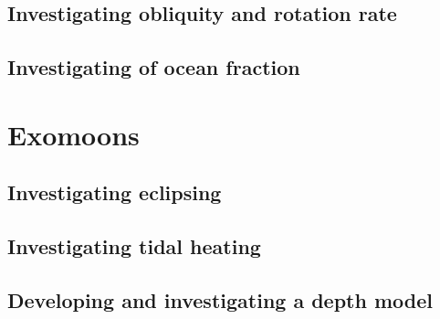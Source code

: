 \documentclass[12pt, onecolumn]{revtex4-2}    %
\begin{document}


\subsection{Investigating obliquity and rotation rate}\label{ssec:InvObliquityRotationRate}
\subsection{Investigating of ocean fraction} \label{ssec:InvOceanFraction}%

\section{Exomoons} \label{sec:Exomoons}
\subsection{Investigating eclipsing} \label{ssec:InvEclipsing}
\subsection{Investigating tidal heating} \label{ssec:InvTidalHeating}
\subsection{Developing and investigating a depth model} \label{ssec:DevInvDepthModel} %
\end{document}
